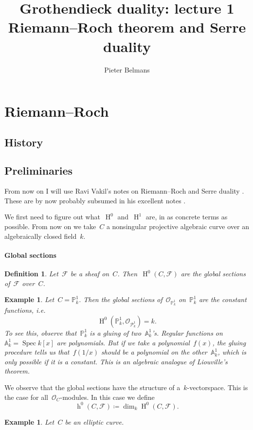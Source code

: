 \documentclass[10pt,a4paper]{article}
\title{Grothendieck duality: lecture 1 \\[.2em] \Large Riemann--Roch theorem and Serre duality}
\author{Pieter Belmans}
\theoremstyle{lecture}
\newtheorem{definition}[theorem]{Definition}
\newtheorem{example}[theorem]{Example}
\newcommand\dash{\nobreakdash-\hspace{0pt}}
\DeclareMathOperator\hh{h}
\DeclareMathOperator\HH{H}
\DeclareMathOperator\Spec{Spec}
\begin{document}
\maketitle

\begin{abstract}
  
\end{abstract}

\tableofcontents

\section{Riemann--Roch}
\label{section:riemann-roch}
\subsection{History}
\label{subsection:riemann-roch-history}

\subsection{Preliminaries}
\label{subsection:preliminaries}
From now on I will use Ravi Vakil's notes on Riemann--Roch and Serre duality \cite{vakil-proof-riemann-roch}. These are by now probably subsumed in his excellent notes \cite{vakil-math216}.

We first need to figure out what~$\HH^0$ and~$\HH^1$ are, in as concrete terms as possible. From now on we take~$C$ a nonsingular projective algebraic curve over an algebraically closed field~$k$.
\paragraph{Global sections}
\begin{definition}
  Let~$\mathcal{F}$ be a sheaf on~$C$. Then~$\HH^0(C,\mathcal{F})$ are the \emph{global sections} of~$\mathcal{F}$ over~$C$.
\end{definition}
\begin{example}
  Let~$C=\mathbb{P}_k^1$. Then the global sections of~$\mathcal{O}_{\mathbb{P}_k^1}$ on~$\mathbb{P}_k^1$ are the constant functions, i.e.
  \begin{equation}
    \HH^0(\mathbb{P}_k^1,\mathcal{O}_{\mathcal{P}_k^1})=k.
  \end{equation}
  To see this, observe that~$\mathbb{P}_k^1$ is a gluing of two~$\mathbb{A}_k^1$'s. Regular functions on~$\mathbb{A}_k^1=\Spec k[x]$ are polynomials. But if we take a polynomial~$f(x)$, the gluing procedure tells us that~$f(1/x)$ should be a polynomial on the other~$\mathbb{A}_k^1$, which is only possible if it is a constant. This is an algebraic analogue of \emph{Liouville's theorem}.
\end{example}
We observe that the global sections have the structure of a~$k$\dash vectorspace. This is the case for all~$\mathcal{O}_C$\dash modules. In this case we define
\begin{equation}
  \hh^0(C,\mathcal{F})\coloneqq\dim_k\HH^0(C,\mathcal{F}).
\end{equation}
\begin{example}
  Let~$C$ be an elliptic curve\expand.
\end{example}
\end{document}
